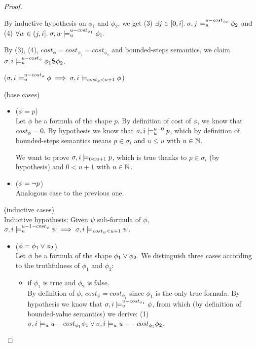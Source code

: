 \begin{theorem}
\begin{lemma}
\begin{proof}
\begin{itemize}
\begin{itemize}
\begin{itemize}
            By inductive hypothesis on $\phi_1$ and $\phi_2$, we get (3) $\exists j \in [0,i].\; \sigma,j \models_{u}^{u-cost_{\phi_2}} \phi_2$ and (4) $\forall w \in (j,i].\; \sigma,w \models_{u}^{u-cost_{\phi_1}} \phi_1$.

            By (3), (4), $cost_\phi = cost_{\phi_1} = cost_{\phi_2}$ and bounded-steps semantics, we claim $\sigma,i \models_{u}^{u-cost_\phi} \phi_1 \mathbf{S} \phi_2$.
        \end{itemize}
    \end{itemize}
\end{itemize}

\noindent ($\sigma,i \models_{u}^{u-cost_\phi} \phi \implies \sigma,i \models_{cost_\phi < u + 1} \phi$)

\noindent (base cases)
\begin{itemize}
    \item ($\phi = p$) \\
    Let $\phi$ be a formula of the shape $p$.
    By definition of cost of $\phi$, we know that $cost_\phi = 0$.
    By hypothesis we know that $\sigma,i \models_{u}^{u-0} p$, which by definition of bounded-steps semantics means $p \in \sigma_i$ and $u \leq u$ with $u \in \mathbb{N}$.

    We want to prove $\sigma,i \models_{0 < u + 1} p$, which is true thanks to $p \in \sigma_i$ (by hypothesis) and $0 < u + 1$ with $u \in \mathbb{N}$. 
    
    \item ($\phi = \neg p$) \\
    Analogous case to the previous one.
\end{itemize}

\noindent (inductive cases) \\
\noindent Inductive hypothesis: Given $\psi$ sub-formula of $\phi$, $\sigma,i \models_{u}^{u-1-cost_\psi} \psi \implies \sigma,i \models_{cost_\psi < u + 1} \psi$.
\begin{itemize}
    \item ($\phi = \phi_1 \lor \phi_2$) \\
    Let $\phi$ be a formula of the shape $\phi_1 \lor \phi_2$.
    We distinguish three cases according to the truthfulness of $\phi_1$ and $\phi_2$:
    \begin{itemize}
        \item if $\phi_1$ is true and $\phi_2$ is false. \\
        By definition of $\phi$, $cost_\phi = cost_{\phi_1}$ since $\phi_1$ is the only true formula.
        By hypothesis we know that $\sigma,i \models_{u}^{u-cost_{\phi_1}} \phi$, from which (by definition of bounded-value semantics) we derive: 
        (1) $\sigma,i \models_{u}{u-cost_{\phi_1}} \phi_1 \lor \sigma,i \models_{u}{u--cost_{\phi_1}} {\phi_2}$.


\end{itemize}
\end{itemize}
\end{proof}
\end{lemma}
\end{theorem}
